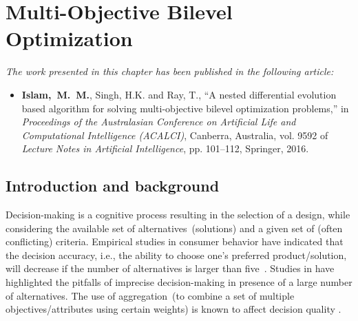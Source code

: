 \chapter{Multi-Objective Bilevel Optimization}


\begin{tcolorbox}
\textit{The work presented in this chapter has been published in the following article:}
\small
\begin{itemize}
\item \textbf{{Islam,~M.~M.}}, {Singh, H.K.} and {Ray, T.}, ``A nested differential evolution based algorithm for solving multi-objective bilevel optimization problems,'' in {\em Proceedings of the Australasian Conference on Artificial Life and Computational Intelligence (ACALCI)}, Canberra, Australia, vol. 9592 of {\em Lecture Notes in Artificial Intelligence}, pp. 101--112, Springer, 2016.
\end{itemize}
\end{tcolorbox}

\section{Introduction and background}
\label{sec:intro}
Decision-making is a cognitive process resulting in the selection of a design, while considering the available set of alternatives~(solutions) and a given set of (often conflicting) criteria. Empirical studies in consumer behavior have indicated that the decision accuracy, i.e., the ability to choose one's preferred product/solution, will decrease if the number of alternatives is larger than five~\cite{jacoby1974brand}. Studies in \cite{Hamel1974} have highlighted the pitfalls of imprecise decision-making in presence of a large number of alternatives. The use of aggregation~(to combine a set of multiple objectives/attributes using certain weights) is known to affect decision quality \cite{gemunden1985number,larichev1992cognitive}. 


